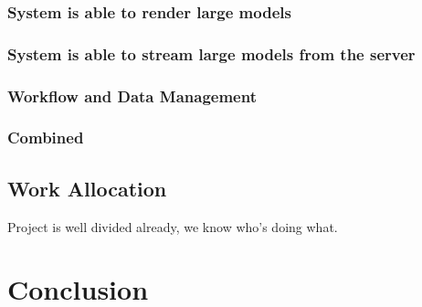 \documentclass[12pt,a4paper]{article}
\begin{document}
\subsubsection*{System is able to render large models}
\subsubsection*{System is able to stream large models from the server}
\subsubsection{Workflow and Data Management}
\subsubsection{Combined}
\subsection{Work Allocation}
Project is well divided already, we know who's doing what.

\section{Conclusion}



	
\end{document}
